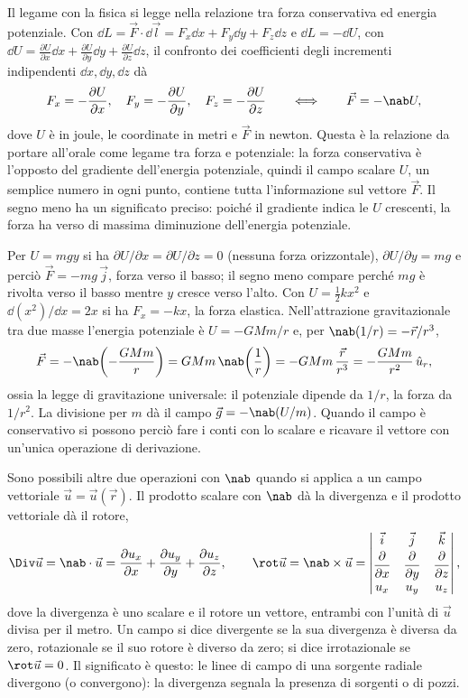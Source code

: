 \documentclass[main.tex]{subfiles}
\begin{document}
Il legame con la fisica si legge nella relazione tra forza conservativa ed energia potenziale. Con $\dd L=\vec F\cdot\dd\vec l=F_x\dd x+F_y\dd y+F_z\dd z$ e $\dd L=-\dd U$, con $\dd U=\frac{\partial U}{\partial x}\dd x+\frac{\partial U}{\partial y}\dd y+\frac{\partial U}{\partial z}\dd z$, il confronto dei coefficienti degli incrementi indipendenti $\dd x,\dd y,\dd z$ dà
\[
F_x=-\frac{\partial U}{\partial x},\quad F_y=-\frac{\partial U}{\partial y},\quad F_z=-\frac{\partial U}{\partial z}\qquad\Longleftrightarrow\qquad \vec F=-\nab U ,
\]
dove $U$ è in joule, le coordinate in metri e $\vec F$ in newton. Questa è la relazione da portare all'orale come legame tra forza e potenziale: la forza conservativa è l'opposto del gradiente dell'energia potenziale, quindi il campo scalare $U$, un semplice numero in ogni punto, contiene tutta l'informazione sul vettore $\vec F$. Il segno meno ha un significato preciso: poiché il gradiente indica le $U$ crescenti, la forza ha verso di massima diminuzione dell'energia potenziale. 

Per $U=mgy$ si ha $\partial U/\partial x=\partial U/\partial z=0$ (nessuna forza orizzontale), $\partial U/\partial y=mg$ e perciò $\vec F=-mg\,\vec j$, forza verso il basso; il segno meno compare perché $mg$ è rivolta verso il basso mentre $y$ cresce verso l'alto. Con $U=\tfrac12kx^2$ e $\dd(x^2)/\dd x=2x$ si ha $F_x=-kx$, la forza elastica. Nell'attrazione gravitazionale tra due masse l'energia potenziale è $U=-GMm/r$ e, per $\nab(1/r)=-\vec r/r^3$,
\[
\vec F=-\nab\!\left(-\frac{GMm}{r}\right)=GMm\,\nab\!\left(\frac1r\right)=-GMm\,\frac{\vec r}{r^3}=-\frac{GMm}{r^2}\,\hat u_r ,
\]
ossia la legge di gravitazione universale: il potenziale dipende da $1/r$, la forza da $1/r^2$. La divisione per $m$ dà il campo $\vec g=-\nab(U/m)$. Quando il campo è conservativo si possono perciò fare i conti con lo scalare e ricavare il vettore con un'unica operazione di derivazione.

Sono possibili altre due operazioni con $\nab$ quando si applica a un campo vettoriale $\vec u=\vec u(\vec r)$. Il prodotto scalare con $\nab$ dà la divergenza e il prodotto vettoriale dà il rotore,
\[
\Div\vec u=\nab\cdot\vec u=\frac{\partial u_x}{\partial x}+\frac{\partial u_y}{\partial y}+\frac{\partial u_z}{\partial z},\qquad
\rot\vec u=\nab\times\vec u=\begin{vmatrix}\vec i&\vec j&\vec k\\[2pt]\dfrac{\partial}{\partial x}&\dfrac{\partial}{\partial y}&\dfrac{\partial}{\partial z}\\[4pt]u_x&u_y&u_z\end{vmatrix},
\]
dove la divergenza è uno scalare e il rotore un vettore, entrambi con l'unità di $\vec u$ divisa per il metro. Un campo si dice divergente se la sua divergenza è diversa da zero, rotazionale se il suo rotore è diverso da zero; si dice irrotazionale se $\rot\vec u=0$. Il significato è questo: le linee di campo di una sorgente radiale divergono (o convergono): la divergenza segnala la presenza di sorgenti o di pozzi. 
\end{document}
